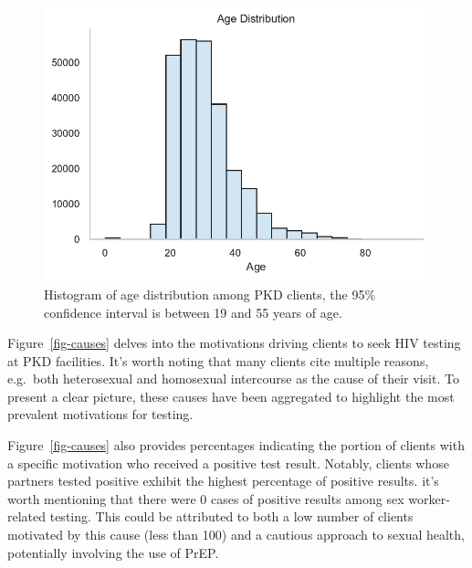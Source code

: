 \documentclass[
  12pt,
  letterpaper,
  DIV=11,
  numbers=noendperiod]{scrartcl}
\begin{document}
\begin{figure}

{\centering \includegraphics{HIVPaper_files/figure-latex/fig-agehist-output-1.pdf}

}

\caption{\label{fig-agehist}Histogram of age distribution among PKD
clients, the 95\% confidence interval is between 19 and 55 years of
age.}

\end{figure}

Figure~\ref{fig-causes} delves into the motivations driving clients to
seek HIV testing at PKD facilities. It's worth noting that many clients
cite multiple reasons, e.g.~both heterosexual and homosexual intercourse
as the cause of their visit. To present a clear picture, these causes
have been aggregated to highlight the most prevalent motivations for
testing.

Figure~\ref{fig-causes} also provides percentages indicating the portion
of clients with a specific motivation who received a positive test
result. Notably, clients whose partners tested positive exhibit the
highest percentage of positive results. it's worth mentioning that there
were 0 cases of positive results among sex worker-related testing. This
could be attributed to both a low number of clients motivated by this
cause (less than 100) and a cautious approach to sexual health,
potentially involving the use of PrEP.
\end{document}
